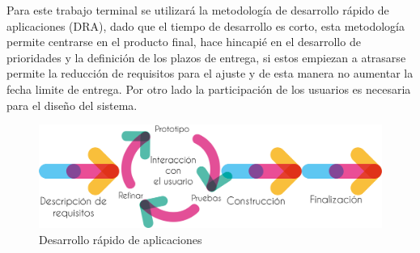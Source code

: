 \documentclass[letterpaper, 10pt]{article}
\begin{document}
Para este trabajo terminal se utilizará la metodología de desarrollo rápido de aplicaciones (DRA), dado que el tiempo de desarrollo es corto, esta metodología permite centrarse en el producto final, hace hincapié en el desarrollo de prioridades y la definición de los plazos de entrega, si estos empiezan a atrasarse permite la reducción de requisitos para el ajuste y de esta manera no aumentar la fecha limite de entrega. Por otro lado la participación de los usuarios es necesaria para el diseño del sistema.\cite{dra}
\begin{figure}[!ht]
    \centering
    \includegraphics[scale=0.50]{Protocolo/images/4x/RAD@4x.png}
    \caption{Desarrollo rápido de aplicaciones}
    \label{graphic:PRecordatorio}
\end{figure}
\end{document}
